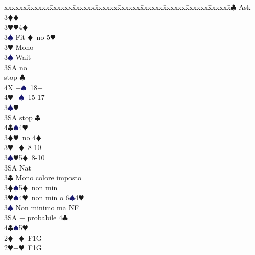 \documentclass[a4paper,italian]{article}
\newcommand{\BC}{\textcolor{OliveGreen}{$\clubsuit$}}
\newcommand{\BD}{\textcolor{RedOrange}{$\vardiamondsuit$}}
\newcommand{\BH}{\textcolor{Red2}{$\varheartsuit${}}}
\newcommand{\BS}{\textcolor{MidnightBlue}{$\spadesuit${}}}
\newenvironment{bidtable}
{\begin{tabbing}

    xxxxxx\=xxxxxx\=xxxxxx\=xxxxxx\=xxxxxx\=xxxxxx\=xxxxxx\=xxxxxx\=xxxxxx\=xxxxxx\=\kill}
{\end{tabbing} }%
\begin{document}
\begin{multicols}{2}
\begin{bidtable}
                                            3\BC \> Ask\+\\
                                            3\BD {}\BD \+\\
                                            3\BH {}\BH 4\BD \\
                                            3\BS \> Fit \BD\ no 5\BH \-\\
                                            3\BH \> Mono\+\\
                                            3\BS \> Wait\+\\
                                            3SA  no\+\\\-stop \BC \\
                                            4X +\BS\ 18+\\
                                            4\BH {}+\BS\ 15-17\-\-\\
                                            3\BS {}\BH\\
                                            3SA  stop \BC \\
                                            4\BC {}\BS 4\BH \-\\
                                            3\BD {}\BH\ no 4\BD \\
                                            3\BH {}+\BD\ 8-10\\
                                            3\BS {}\BH 5\BD\ 8-10\\
                                            3SA \> Nat\-\\
                                            3\BC \> Mono colore imposto\\
                                            3\BD {}\BS 5\BD\ non min\\
                                            3\BH {}\BS 4\BH\ non min o 6\BS 4\BH \\
                                            3\BS \> Non minimo ma NF\\
                                            3SA + probabile 4\BC \\
                                            4\BC {}\BS 5\BH \-\\
                                            2\BD {}+\BD\ F1G\\
                                            2\BH {}+\BH\ F1G\+\\

\end{bidtable}
\end{multicols}
\end{document}
